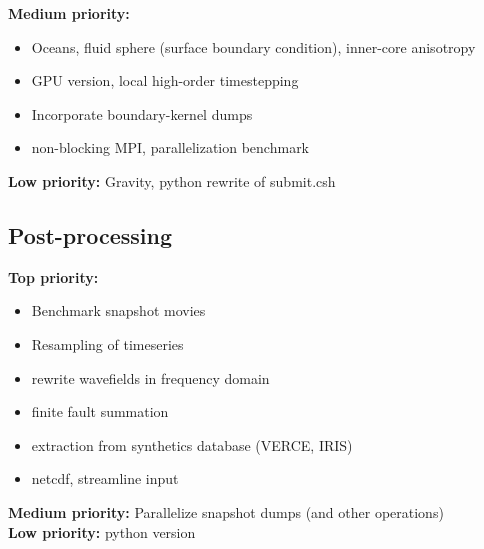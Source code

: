 \documentclass[11pt,letter,fleqn,english,notitlepage]{article}
\begin{document}
\noindent\textbf{Medium priority:}
\begin{itemize}
    \item Oceans, fluid sphere (surface boundary condition),
      inner-core anisotropy
    \item GPU version, local high-order timestepping
    \item Incorporate boundary-kernel dumps
    \item non-blocking MPI, parallelization benchmark

\end{itemize}

\noindent\textbf{Low priority:}
Gravity, python rewrite of submit.csh

\subsection{Post-processing}
\noindent\textbf{Top priority:} 
\begin{itemize}
    \item Benchmark snapshot movies
    \item Resampling of timeseries
    \item rewrite wavefields in frequency domain
    \item finite fault summation
    \item extraction from synthetics database (VERCE, IRIS)
    \item netcdf, streamline input
\end{itemize}

\noindent\textbf{Medium priority:}
Parallelize snapshot dumps (and other operations)\\

\noindent\textbf{Low priority:} python version

\end{document}
